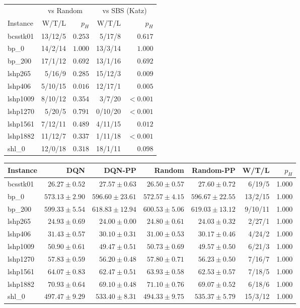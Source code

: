 \begin{tabular}{lrrrr}
\toprule
& \multicolumn{2}{c}{vs Random} & \multicolumn{2}{c}{vs SBS (Katz)}\\
\cmidrule(lr){2-3}\cmidrule(lr){4-5}
Instance & W/T/L & $p_H$ & W/T/L & $p_H$\\
\midrule
bcsstk01 & 13/12/5 & $0.253$ & 5/17/8 & $0.617$\\
bp\_0 & 14/2/14 & $1.000$ & 13/3/14 & $1.000$\\
bp\_200 & 17/1/12 & $0.692$ & 13/1/16 & $0.692$\\
lshp265 & 5/16/9 & $0.285$ & 15/12/3 & $\mathbf{0.009}$\\
lshp406 & 5/10/15 & $\mathbf{0.016}$ & 12/17/1 & $\mathbf{0.005}$\\
lshp1009 & 8/10/12 & $0.354$ & 3/7/20 & $\mathbf{<0.001}$\\
lshp1270 & 5/20/5 & $0.791$ & 0/10/20 & $\mathbf{<0.001}$\\
lshp1561 & 7/12/11 & $0.489$ & 4/11/15 & $\mathbf{0.012}$\\
lshp1882 & 11/12/7 & $0.337$ & 1/11/18 & $\mathbf{<0.001}$\\
shl\_0 & 12/0/18 & $0.318$ & 18/1/11 & $0.098$\\
\bottomrule
\end{tabular}

\begin{tabular}{lrrrrrr}
\toprule
Instance & DQN & DQN-PP & Random & Random-PP & W/T/L & $p_H$\\
\midrule
bcsstk01 & $26.27\pm0.52$ & $27.57\pm0.63$ & $26.50\pm0.57$ & $27.60\pm0.72$ & 6/19/5 & 1.000\\
bp\_0 & $573.13\pm2.90$ & $596.60\pm23.61$ & $572.57\pm4.15$ & $596.67\pm22.55$ & 13/2/15 & 1.000\\
bp\_200 & $599.33\pm5.54$ & $618.83\pm12.94$ & $600.53\pm5.06$ & $619.03\pm13.12$ & 9/10/11 & 1.000\\
lshp265 & $24.93\pm0.69$ & $24.00\pm0.00$ & $24.80\pm0.61$ & $24.03\pm0.32$ & 2/27/1 & 1.000\\
lshp406 & $31.43\pm0.57$ & $30.10\pm0.31$ & $31.00\pm0.53$ & $30.17\pm0.46$ & 4/24/2 & 1.000\\
lshp1009 & $50.90\pm0.61$ & $49.47\pm0.51$ & $50.73\pm0.69$ & $49.57\pm0.50$ & 6/21/3 & 1.000\\
lshp1270 & $57.83\pm0.59$ & $56.20\pm0.48$ & $57.80\pm0.71$ & $56.23\pm0.50$ & 7/16/7 & 1.000\\
lshp1561 & $64.07\pm0.83$ & $62.47\pm0.51$ & $63.93\pm0.58$ & $62.53\pm0.57$ & 7/18/5 & 1.000\\
lshp1882 & $70.93\pm0.64$ & $69.10\pm0.48$ & $71.10\pm0.76$ & $69.07\pm0.52$ & 6/18/6 & 1.000\\
shl\_0 & $497.47\pm9.29$ & $533.40\pm8.31$ & $494.33\pm9.75$ & $535.37\pm5.79$ & 15/3/12 & 1.000\\
\bottomrule
\end{tabular}